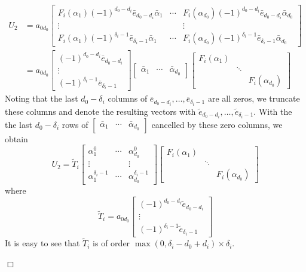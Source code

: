 \documentclass{article}
\newenvironment{proof}{\noindent{\em Proof:}}{$\Box$~\\}
\begin{document}
\begin{proof}
\begin{align*}
U_2&=a_{0d_0}
\begin{bmatrix}
{F_i}({\alpha _1}){{( - 1)}^{{d_0} - {d_i}}}\bar{e}_{{d_0} - {d_i}}\bar{\alpha}_1& \cdots &{{F_i}({\alpha _{{d_0}}}){{( - 1)}^{{d_0} - {d_i}}}}\bar{e}_{{d_0} - {d_i}}\bar{\alpha}_{d_0}\\
 \vdots &{}& \vdots \\
{F_i}({\alpha _1}){{( - 1)}^{{\delta _i} - 1}}\bar{e}_{\delta_i-1}\bar{\alpha}_1& \cdots &{{F_i}({\alpha _{{d_0}}}){{( - 1)}^{{\delta _i} - 1}}}\bar{e}_{\delta_i-1}\bar{\alpha}_{d_0}
\end{bmatrix}\\
&=a_{{0d_0}}\begin{bmatrix}
{{( - 1)}^{{d_0} - {d_i}}}\bar{e}_{{d_0} - {d_i}}\\
\vdots\\
{{( - 1)}^{{\delta _i} - 1}}\bar{e}_{\delta_i-1}
\end{bmatrix}
\begin{bmatrix}
\bar{\alpha}_1&\cdots&\bar{\alpha}_{d_0}
\end{bmatrix}
\begin{bmatrix}
{F_i}({\alpha _1})\\
&\ddots&\\
&&{F_i}({\alpha _{d_0}})\end{bmatrix}
\end{align*}
Noting that
the last $d_0-\delta_i$ columns of $\bar{e}_{{d_0} - {d_i}},\ldots,\bar{e}_{\delta_i-1}$ are all zeros, we truncate these columns and denote the resulting vectors with $\tilde{e}_{{d_0} - {d_i}},\ldots,\tilde{e}_{\delta_i-1}$. With the the last $d_0-\delta_i$ rows of $\begin{bmatrix}
\bar{\alpha}_1&\cdots&\bar{\alpha}_{d_0}
\end{bmatrix}$ cancelled by these zero columns,   we obtain
$$U_2=\tilde{T}_i
\begin{bmatrix}
{\alpha}_1^0&\cdots&{\alpha}_{d_0}^0\\
\vdots&&\vdots\\
{\alpha}_1^{\delta_i-1}&\cdots&{\alpha}_{d_0}^{\delta_i-1}
\end{bmatrix}
\begin{bmatrix}
{F_i}({\alpha _1})\\
&\ddots&\\
&&{F_i}({\alpha _{d_0}})\end{bmatrix}
$$
where
\[\tilde{T}_i=a_{{0d_0}}\begin{bmatrix}
{{( - 1)}^{{d_0} - {d_i}}}\tilde{e}_{{d_0} - {d_i}}\\
\vdots\\
{{( - 1)}^{{\delta _i} - 1}}\tilde{e}_{\delta_i-1}
\end{bmatrix}
\]
It is easy to see that $\tilde{T}_i$ is of order $\max(0, \delta_i-d_0+d_i)\times\delta_i $.


\end{proof}
\end{document}

